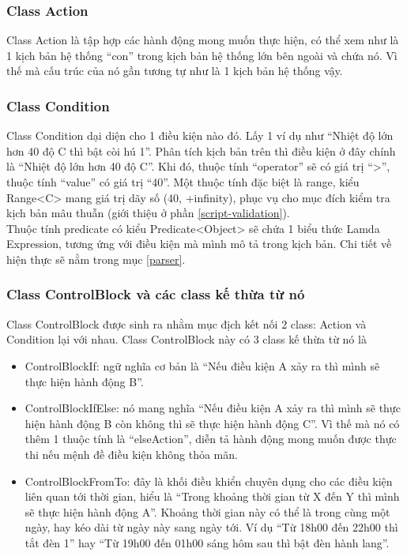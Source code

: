 \documentclass[12pt,a4paper,oneside]{extbook}
\begin{document}
\subsubsection{Class Action}

Class Action là tập hợp các hành động mong muốn thực hiện, có thể xem như là 1 kịch bản hệ thống “con” trong kịch bản hệ thống lớn bên ngoài và chứa nó. Vì thế mà cấu trúc của nó gần tương tự như là 1 kịch bản hệ thống vậy.

\subsubsection{Class Condition}

Class Condition dại diện cho 1 điều kiện nào đó. Lấy 1 ví dụ như “Nhiệt độ lớn hơn 40 độ C thì bật còi hú 1”. Phân tích kịch bản trên thì điều kiện ở đây chính là “Nhiệt độ lớn hơn 40 độ C”. Khi đó, thuộc tính “operator” sẽ có giá trị “>”, thuộc tính “value” có giá trị “40”. Một thuộc tính đặc biệt là range, kiểu Range<C> mang giá trị dãy số (40, +infinity), phục vụ cho mục đích kiểm tra kịch bản mâu thuẫn (giới thiệu ở phần \ref{script-validation}).\\

\noindent
Thuộc tính predicate có kiểu Predicate<Object> sẽ chứa 1 biểu thức Lamda Expression, tương ứng với điều kiện mà mình mô tả trong kịch bản. Chi tiết về hiện thực sẽ nằm trong mục \ref{parser}.

\subsubsection{Class ControlBlock và các class kế thừa từ nó}

Class ControlBlock được sinh ra nhằm mục địch kết nối 2 class: Action và Condition lại với nhau. Class ControlBlock này có 3 class kế thừa từ nó là

	\begin{itemize} [topsep=1mm,itemsep=-0.5mm]
	\item ControlBlockIf: ngữ nghĩa cơ bản là “Nếu điều kiện A xảy ra thì mình sẽ thực hiện hành động B”.
	\item ControlBlockIfElse: nó mang nghĩa “Nếu điều kiện A xảy ra thì mình sẽ thực hiện hành động B còn không thì sẽ thực hiện hành động C”. Vì thế mà nó có thêm 1 thuộc tính là “elseAction”, diễn tả hành động mong muốn được thực thi nếu mệnh đề điều kiện không thỏa mãn.
	\item ControlBlockFromTo: đây là khối điều khiển chuyên dụng cho các điều kiện liên quan tới thời gian, hiểu là “Trong khoảng thời gian từ X đến Y thì mình sẽ thực hiện hành động A”. Khoảng thời gian này có thể là trong cùng một ngày, hay kéo dài từ ngày này sang ngày tới. Ví dụ “Từ 18h00 đến 22h00 thì tắt đèn 1” hay “Từ 19h00 đến 01h00 sáng hôm sau thì bật đèn hành lang”.
	\vspace{1mm}
	\end{itemize}
\end{document}
